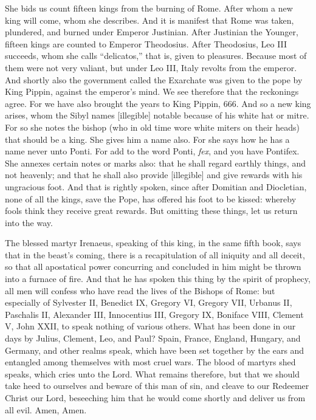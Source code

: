 She bids us count fifteen kings from the burning of Rome. After whom a new king will come, whom she describes. And it is manifest that Rome was taken, plundered, and burned under Emperor Justinian. After Justinian the Younger, fifteen kings are counted to Emperor Theodosius. After Theodosius, Leo III succeeds, whom she calls “delicatos,” that is, given to pleasures. Because most of them were not very valiant, but under Leo III, Italy revolts from the emperor. And shortly also the government called the Exarchate was given to the pope by King Pippin, against the emperor’s mind. We see therefore that the reckonings agree. For we have also brought the years to King Pippin, 666. And so a new king arises, whom the Sibyl names [illegible] notable because of his white hat or mitre. For so she notes the bishop (who in old time wore white miters on their heads) that should be a king. She gives him a name also. For she says how he has a name never unto Ponti. For add to the word Ponti, \textit{fex}, and you have Pontifex. She annexes certain notes or marks also: that he shall regard earthly things, and not heavenly; and that he shall also provide [illegible] and give rewards with his ungracious foot. And that is rightly spoken, since after Domitian and Diocletian, none of all the kings, save the Pope, has offered his foot to be kissed: whereby fools think they receive great rewards. But omitting these things, let us return into the way.

The blessed martyr Irenaeus, speaking of this king, in the same fifth book, says that in the beast’s coming, there is a recapitulation of all iniquity and all deceit, so that all apostatical power concurring and concluded in him might be thrown into a furnace of fire. And that he has spoken this thing by the spirit of prophecy, all men will confess who have read the lives of the Bishops of Rome: but especially of Sylvester II, Benedict IX, Gregory VI, Gregory VII, Urbanus II, Paschalis II, Alexander III, Innocentius III, Gregory IX, Boniface VIII, Clement V, John XXII, to speak nothing of various others. What has been done in our days by Julius, Clement, Leo, and Paul? Spain, France, England, Hungary, and Germany, and other realms speak, which have been set together by the ears and entangled among themselves with most cruel wars. The blood of martyrs shed speaks, which cries unto the Lord. What remains therefore, but that we should take heed to ourselves and beware of this man of sin, and cleave to our Redeemer Christ our Lord, beseeching him that he would come shortly and deliver us from all evil. Amen, Amen.
